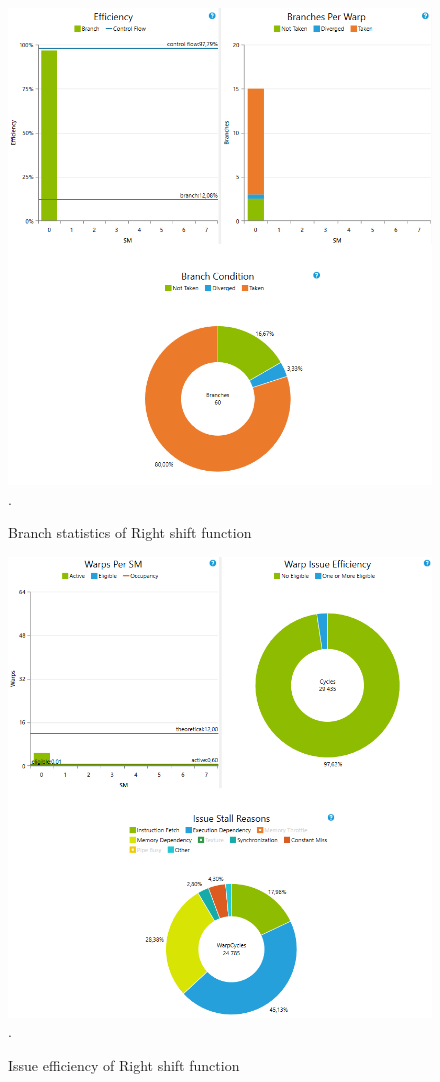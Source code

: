 \documentclass[oneside,openright,12pt,final,en]{mgr}
\begin{document}
\begin{figure}[H]
	\centering
	\includegraphics[width=\textwidth]{rightshift_branch}.
	\caption{Branch statistics of Right shift function}
	\label{fig:rightshift_branch}
\end{figure}

\begin{figure}[H]
	\centering
	\includegraphics[width=\textwidth]{rightshift_issue}.
	\caption{Issue efficiency of Right shift function}
	\label{fig:rightshift_issue}
\end{figure}
\end{document}
